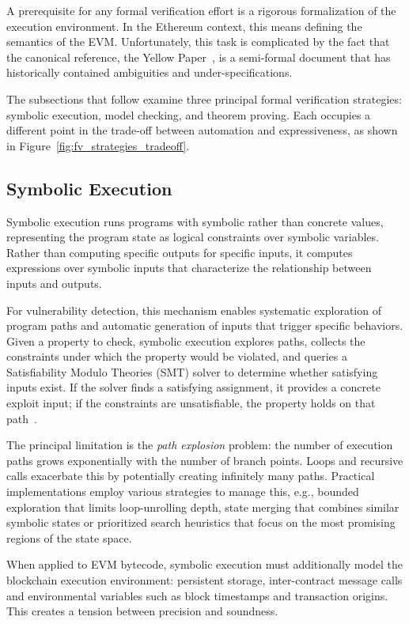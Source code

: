 A prerequisite for any formal verification effort is a rigorous formalization of the execution environment. In the Ethereum context, this means defining the semantics of the EVM. Unfortunately, this task is complicated by the fact that the canonical reference, the Yellow Paper~\cite{wood2014yellow}, is a semi-formal document that has historically contained ambiguities and under-specifications.

The subsections that follow examine three principal formal verification strategies: symbolic execution, model checking, and theorem proving. Each occupies a different point in the trade-off between automation and expressiveness, as shown in Figure~\ref{fig:fv_strategies_tradeoff}.

\subsection{Symbolic Execution}
\label{subsec:symbolic-execution}

Symbolic execution runs programs with symbolic rather than concrete values, representing the program state as logical constraints over symbolic variables. Rather than computing specific outputs for specific inputs, it computes expressions over symbolic inputs that characterize the relationship between inputs and outputs.

For vulnerability detection, this mechanism enables systematic exploration of program paths and automatic generation of inputs that trigger specific behaviors. Given a property to check, symbolic execution explores paths, collects the constraints under which the property would be violated, and queries a Satisfiability Modulo Theories (SMT) solver to determine whether satisfying inputs exist. If the solver finds a satisfying assignment, it provides a concrete exploit input; if the constraints are unsatisfiable, the property holds on that path~\cite{cadar2013symbolic}.

The principal limitation is the \emph{path explosion} problem: the number of execution paths grows exponentially with the number of branch points. Loops and recursive calls exacerbate this by potentially creating infinitely many paths. Practical implementations employ various strategies to manage this, e.g., bounded exploration that limits loop-unrolling depth, state merging that combines similar symbolic states or prioritized search heuristics that focus on the most promising regions of the state space.

When applied to EVM bytecode, symbolic execution must additionally model the blockchain execution environment: persistent storage, inter-contract message calls and environmental variables such as block timestamps and transaction origins. This creates a tension between precision and soundness.

